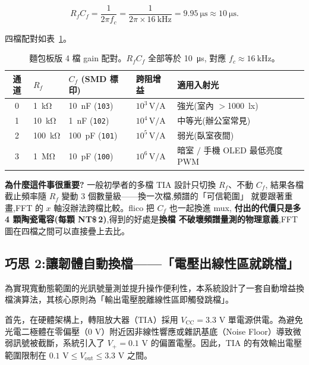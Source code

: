 \documentclass[12pt,a4paper]{article}
\begin{document}
\begin{equation}
	R_f C_f = \frac{1}{2\pi f_c} = \frac{1}{2\pi \times \SI{16}{\kilo\hertz}}
	= \SI{9.95}{\micro\second} \approx \SI{10}{\micro\second}.
	\label{eq:rc-product}
\end{equation}

四檔配對如表~\ref{tab:gain-current}。

\begin{table}[H]
	\centering
	\caption{麵包板版 4 檔 gain 配對。\(R_f C_f\) 全部等於 \SI{10}{\micro\second},
		對應 \(f_c \approx \SI{16}{\kilo\hertz}\)。}
	\label{tab:gain-current}
	\begin{tabular}{cllll}
		\toprule
		通道 & \(R_f\)             & \(C_f\) (SMD 標印)                     & 跨阻增益                 & 適用入射光                     \\
		\midrule
		0  & \SI{1}{\kilo\ohm}   & \SI{10}{\nano\farad} (\texttt{103})  & \(10^3\,\text{V/A}\) & 強光(室內 \(>\)\SI{1000}{lx}) \\
		1  & \SI{10}{\kilo\ohm}  & \SI{1}{\nano\farad} (\texttt{102})   & \(10^4\,\text{V/A}\) & 中等光(辦公室常見)                \\
		2  & \SI{100}{\kilo\ohm} & \SI{100}{\pico\farad} (\texttt{101}) & \(10^5\,\text{V/A}\) & 弱光(臥室夜間)                  \\
		3  & \SI{1}{\mega\ohm}   & \SI{10}{\pico\farad} (\texttt{100})  & \(10^6\,\text{V/A}\) & 暗室 \(/\) 手機 OLED 最低亮度 PWM \\
		\bottomrule
	\end{tabular}
\end{table}

\textbf{為什麼這件事很重要?} 一般初學者的多檔 TIA 設計只切換 \(R_f\)、不動 \(C_f\),
結果各檔截止頻率隨 \(R_f\) 變動 \(3\) 個數量級——換一次檔,頻譜的「可信範圍」
就要跟著重畫,FFT 的 \(x\) 軸沒辦法跨檔比較。flico 把 \(C_f\) 也一起換進 mux,
\textbf{付出的代價只是多 4 顆陶瓷電容(每顆 NT\$\,2)},得到的好處是\textbf{換檔
	不破壞頻譜量測的物理意義},FFT 圖在四檔之間可以直接疊上去比。

\subsection{巧思 2:讓韌體自動換檔——「電壓出線性區就跳檔」}
為實現寬動態範圍的光訊號量測並提升操作便利性，本系統設計了一套自動增益換檔演算法，其核心原則為「輸出電壓脫離線性區即觸發跳檔」。

首先，在硬體架構上，轉阻放大器（TIA）採用 $V_{\text{CC}} = 3.3\text{ V}$ 單電源供電。為避免光電二極體在零偏壓（$0\text{ V}$）附近因非線性響應或雜訊基底（Noise Floor）導致微弱訊號被截斷，系統引入了 $V_{+} = 0.1\text{ V}$ 的偏置電壓。因此，TIA 的有效輸出電壓範圍限制在 $0.1\text{ V} \le V_{\text{out}} \le 3.3\text{ V}$ 之間。
\end{document}
